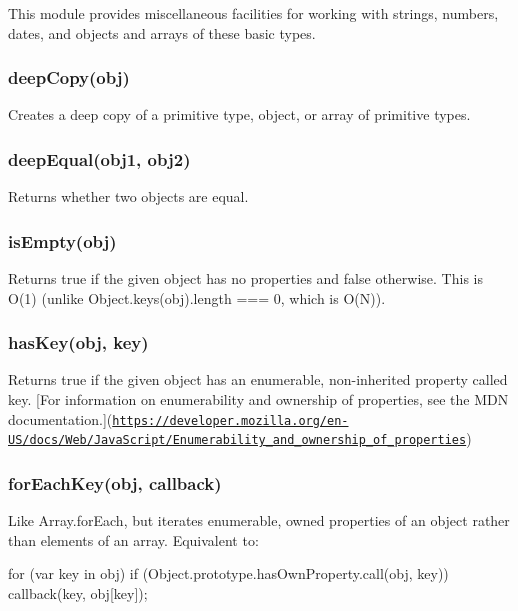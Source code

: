 This module provides miscellaneous facilities for working with strings, numbers, dates, and objects and arrays of these basic types.

\subsubsection*{deep\+Copy(obj)}

Creates a deep copy of a primitive type, object, or array of primitive types.

\subsubsection*{deep\+Equal(obj1, obj2)}

Returns whether two objects are equal.

\subsubsection*{is\+Empty(obj)}

Returns true if the given object has no properties and false otherwise. This is O(1) (unlike {\ttfamily Object.\+keys(obj).length === 0}, which is O(\+N)).

\subsubsection*{has\+Key(obj, key)}

Returns true if the given object has an enumerable, non-\/inherited property called {\ttfamily key}. \mbox{[}For information on enumerability and ownership of properties, see the M\+DN documentation.\mbox{]}(\href{https://developer.mozilla.org/en-US/docs/Web/JavaScript/Enumerability_and_ownership_of_properties}{\tt https\+://developer.\+mozilla.\+org/en-\/\+U\+S/docs/\+Web/\+Java\+Script/\+Enumerability\+\_\+and\+\_\+ownership\+\_\+of\+\_\+properties})

\subsubsection*{for\+Each\+Key(obj, callback)}

Like Array.\+for\+Each, but iterates enumerable, owned properties of an object rather than elements of an array. Equivalent to\+: \begin{DoxyVerb}for (var key in obj) {
        if (Object.prototype.hasOwnProperty.call(obj, key)) {
                callback(key, obj[key]);
        }
}
\end{DoxyVerb}



